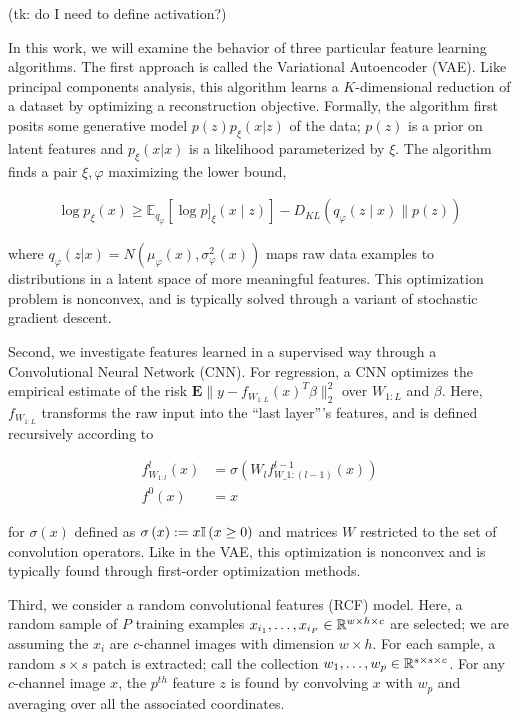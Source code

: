 (tk: do I need to define activation?)

In this work, we will examine the behavior of three particular feature learning algorithms. The first approach is called the Variational Autoencoder (VAE). Like principal components analysis, this algorithm learns a $K$-dimensional reduction of a dataset by optimizing a reconstruction objective. Formally, the algorithm first posits some generative model $p\left(z\right)p_{\xi}\left(x \vert z\right)$ of the data; $p\left(z\right)$ is a prior on latent features and $p_{\xi}\left(x \vert x\right)$ is a likelihood parameterized by $\xi$. The algorithm finds a pair $\xi, \varphi$ maximizing the lower bound,

\begin{align*}
\log p_{\xi}\left(x\right) \geq  \mathbb{E}_{q_{\varphi}}\left[\log p]_{\xi}(x \mid z)\right]-D_{KL}\left(q_{\varphi}(z \mid x) \| p(z)\right)
\end{align*}

where $q_{\varphi}\left(z \vert x\right) = N\left(\mu_{\varphi}\left(x\right), \sigma^{2}_{\varphi}\left(x\right)\right)$ maps raw data examples to distributions in a latent space of more meaningful features. This optimization problem is nonconvex, and is typically solved through a variant of stochastic gradient descent.

Second, we investigate features learned in a supervised way through a
Convolutional Neural Network (CNN). For regression, a CNN optimizes the
empirical estimate of the risk $\mathbf{E}\|y -
f_{W_{1:L}}\left(x\right)^{T}\beta\|_{2}^{2}$ over $W_{1:L}$ and $\beta$. Here,
$f_{W_{1:L}}$ transforms the raw input into the ``last layer''’s features, and
is defined recursively according to

\begin{align*}
f^{l}_{W_{1:l}}\left(x\right) &= \sigma\left(W_{l}f^{l - 1}_{W\_{1:(l - 1)}}\left(x\right)\right)\\
f^{0}\left(x\right) &= x
\end{align*}

for $\sigma\left(x\right)$ defined as $\sigma\left(x\right) := x \mathbb{I}\left({x \geq
  0}\right)$ and matrices $W$ restricted to the set of convolution operators. Like in
the VAE, this optimization is nonconvex and is typically found through
first-order optimization methods.

Third, we consider a random convolutional features (RCF) model. Here, a random
sample of $P$ training examples $x_{i_1}, \dots, x_{i_P} \in \mathbb{R}^{w \times h
  \times c}$ are selected; we are assuming the $x_{i}$ are $c$-channel images
with dimension $w\times h$. For each sample, a random $s \times s$ patch is
extracted; call the collection $w_{1}, \dots, w_{p} \in \mathbb{R}^{s \times s
  \times c}$. For any $c$-channel image $x$, the $p^{th}$ feature $z$ is found
by convolving $x$ with $w_{p}$ and averaging over all the associated
coordinates.

